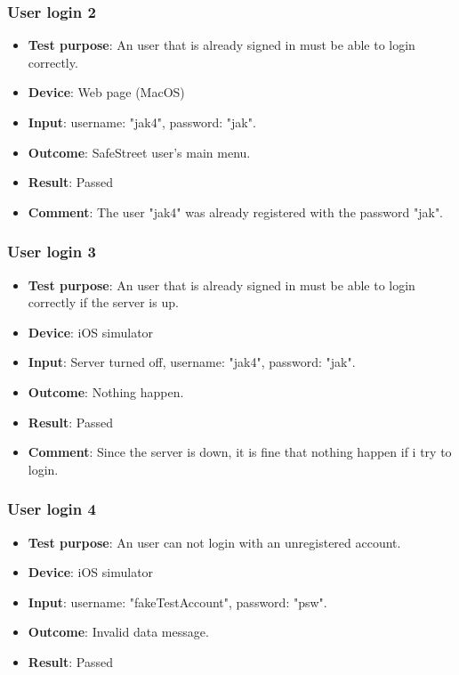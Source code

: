 \documentclass[../ATD.tex]{subfiles}
\begin{document}
    \subsubsection{User login 2}\label{subsubsec:user-login-2}
    \begin{itemize}
        \item \textbf{Test purpose}: An user that is already signed in must be able to login correctly.
        \item \textbf{Device}: Web page (MacOS)
        \item \textbf{Input}: username: "jak4", password: "jak".
        \item \textbf{Outcome}: SafeStreet user's main menu.
        \item \textbf{Result}: Passed
        \item \textbf{Comment}: The user "jak4" was already registered with the password "jak".
    \end{itemize}

    \subsubsection{User login 3}\label{subsubsec:user-login-3}
    \begin{itemize}
        \item \textbf{Test purpose}: An user that is already signed in must be able to login correctly if the server is up.
        \item \textbf{Device}: iOS simulator
        \item \textbf{Input}: Server turned off, username: "jak4", password: "jak".
        \item \textbf{Outcome}: Nothing happen.
        \item \textbf{Result}: Passed
        \item \textbf{Comment}: Since the server is down, it is fine that nothing happen if i try to login.
    \end{itemize}

    \subsubsection{User login 4}\label{subsubsec:user-login-4}
    \begin{itemize}
        \item \textbf{Test purpose}: An user can not login with an unregistered account.
        \item \textbf{Device}: iOS simulator
        \item \textbf{Input}: username: "fakeTestAccount", password: "psw".
        \item \textbf{Outcome}: Invalid data message.
        \item \textbf{Result}: Passed
    \end{itemize}
\end{document}
